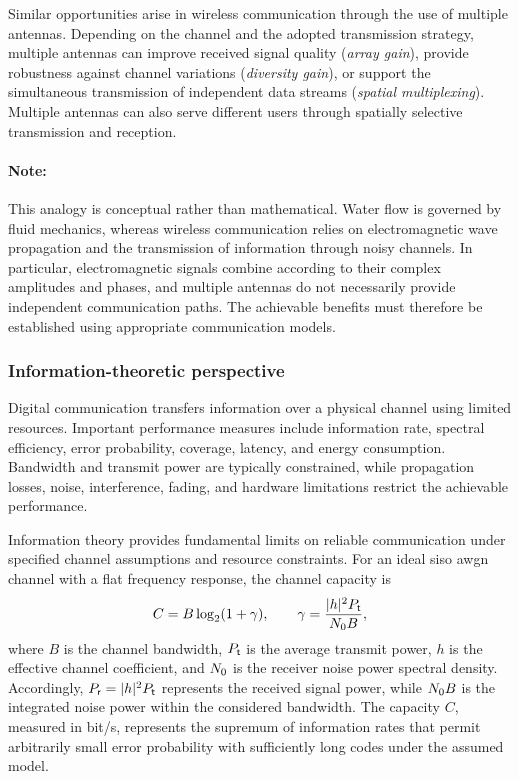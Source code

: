 \vspace{10pt}
Similar opportunities arise in wireless communication through
the use of multiple antennas. Depending on the channel and the
adopted transmission strategy, multiple antennas can improve
received signal quality (\emph{array gain}), provide robustness
against channel variations (\emph{diversity gain}), or support
the simultaneous transmission of independent data streams
(\emph{spatial multiplexing}). Multiple antennas can also serve
different users through spatially selective transmission and
reception.

\paragraph*{Note:} This analogy is conceptual rather than mathematical. Water flow
is governed by fluid mechanics, whereas wireless communication
relies on electromagnetic wave propagation and the transmission
of information through noisy channels. In particular,
electromagnetic signals combine according to their complex
amplitudes and phases, and multiple antennas do not necessarily
provide independent communication paths. The achievable benefits
must therefore be established using appropriate communication
models.


\subsubsection*{Information-theoretic perspective}

Digital communication transfers information over a physical
channel using limited resources. Important performance measures
include information rate, spectral efficiency, error probability,
coverage, latency, and energy consumption. Bandwidth and transmit
power are typically constrained, while propagation losses, noise,
interference, fading, and hardware limitations restrict the
achievable performance.

Information theory provides fundamental limits on reliable
communication under specified channel assumptions and resource
constraints. For an ideal \ac{siso}
\ac{awgn} channel with a flat
frequency response, the channel capacity is
\begin{equation}
	C = B \log_2(1+\gamma),
	\qquad
	\gamma =
	\frac{|h|^2P_{\mathsf{t}}}{N_{0} B},
	\label{eq:siso_capacity_intro}
\end{equation}
where $B$ is the channel bandwidth, $P_{\mathsf{t}}$ is the average
transmit power, $h$ is the effective channel coefficient, and
$N_{0}$ is the receiver noise power spectral density. Accordingly,
$ P_{\mathsf{r}} = |h|^2P_{\mathsf{t}}$ represents the received signal power, while
$N_{0} B$ is the integrated noise power within the considered bandwidth.
%
The capacity $C$, measured in bit/s, represents the supremum of
information rates that permit arbitrarily small error probability
with sufficiently long codes under the assumed model.

